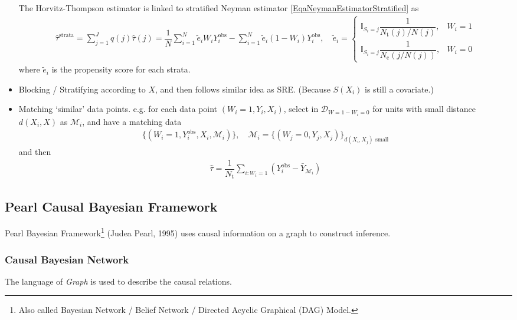 \begin{itemize}[topsep=2pt,itemsep=0pt]
    The Horvitz-Thompson estimator is linked to stratified Neyman estimator \autoref{EqaNeymanEstimatorStratified} as
    \begin{align}
         \hat{\tau}^\mathrm{strata}=\sum_{j=1}^Jq(j)\hat{\tau}(j)= \dfrac{1}{N} \sum_{i=1}^N \tilde{e} _iW_iY^\mathrm{obs}_i-\sum_{i=1}^N\tilde{e} _i(1-W_i)Y^\mathrm{obs}_i ,\quad \tilde{e} _i=\begin{cases}
            \mathbb{I}_{S_i=j}\dfrac{1}{N_\mathrm{t}(j)/N(j) },&W_i=1\\
            \mathbb{I}_{S_i=j}\dfrac{1}{N_\mathrm{c}(j/N(j)) },&W_i=0
         \end{cases}
    \end{align}
    where $ \tilde{e }_i $ is the propensity score for each strata.
    \item Blocking / Stratifying according to $ X $, and then follows similar idea as SRE. (Because $ S(X_i) $ is still a covariate.)
    \item Matching `similar' data points. e.g. for each data point $ (W_i=1,Y_i,X_i) $, select in $ \mathcal{D}_{W=1-W_i=0} $ for units with small distance $ d(X_i,X) $ as $ \mathcal{M}_i $, and have a matching data
    \begin{align}
        \{(W_i=1,Y_i^\mathrm{obs} ,X_i,\mathcal{M}_i)\},\quad \mathcal{M}_i=\{(W_j=0,Y_j,X_j)\}_{d(X_i,X_j)\text{ small}} 
    \end{align}
    and then
    \begin{align}
        \hat{\tau} =\dfrac{1}{N_\mathrm{t} }\sum_{i:W_i=1}\left(Y_i^\mathrm{obs}-\bar{Y}_{\mathcal{M}_i} \right)
    \end{align}
\end{itemize}


\subsection{Pearl Causal Bayesian Framework}
    Pearl Bayesian Framework\footnote{Also called Bayesian Network / Belief Network / Directed Acyclic Graphical (DAG) Model.} (Judea Pearl, 1995) uses causal information on a graph to construct inference. 

    
\subsubsection{Causal Bayesian Network}
The language of \textit{Graph} is used to describe the causal relations. 

